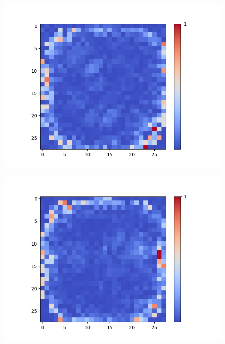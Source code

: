 \begin{figure}[H]
\begin{minipage}[b]{0.19\textwidth}
		\label{}
	\end{minipage}
	\begin{minipage}[b]{0.19\textwidth}
		\includegraphics[width=\textwidth]{SAE(20LF)/Feature-10.png}
		\label{}
	\end{minipage}
	\begin{minipage}[b]{0.19\textwidth}
		\includegraphics[width=\textwidth]{SAE(20LF)/Feature-12.png}
		\label{}
	\end{minipage}
	\begin{minipage}[b]{0.19\textwidth}

\end{minipage}
\end{figure}
